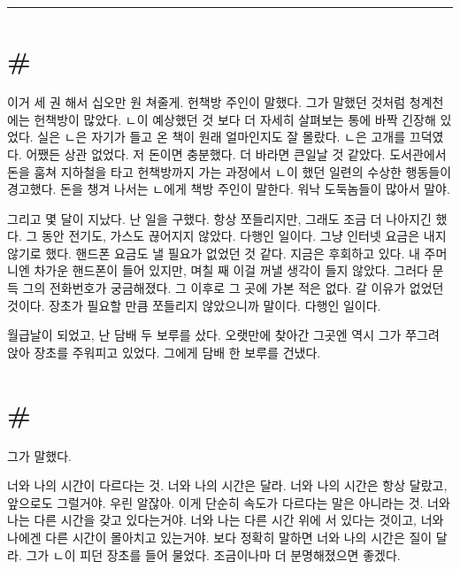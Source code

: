\documentclass[a5paper,10pt, twoside, openright]{memoir}
\begin{document}
	\clearpage{}
		\savepagenumber
		\pagestyle{empty} 
	\rule[0pt]{\textwidth}{\textheight}
	

	\clearpage{}
		\restorepagenumber
		\pagestyle{plain}

	\section{\#}
	이거 세 권 해서 십오만 원 쳐줄게. 헌책방 주인이 말했다. 그가 말했던 것처럼 청계천에는 헌책방이 많았다. ㄴ이 예상했던 것 보다 더 자세히 살펴보는 통에 바짝 긴장해 있었다. 실은 ㄴ은 자기가 들고 온 책이 원래 얼마인지도 잘 몰랐다. ㄴ은 고개를 끄덕였다. 어쨌든 상관 없었다. 저 돈이면 충분했다. 더 바라면 큰일날 것 같았다. 도서관에서 돈을 훔쳐 지하철을 타고 헌책방까지 가는 과정에서 ㄴ이 했던 일련의 수상한 행동들이 경고했다. 돈을 챙겨 나서는 ㄴ에게 책방 주인이 말한다. 워낙 도둑놈들이 많아서 말야. 

	그리고 몇 달이 지났다. 난 일을 구했다. 항상 쪼들리지만, 그래도 조금 더 나아지긴 했다. 그 동안 전기도, 가스도 끊어지지 않았다. 다행인 일이다. 그냥 인터넷 요금은 내지 않기로 했다. 핸드폰 요금도 낼 필요가 없었던 것 같다. 지금은 후회하고 있다. 내 주머니엔 차가운 핸드폰이 들어 있지만, 며칠 째 이걸 꺼낼 생각이 들지 않았다. 그러다 문득 그의 전화번호가 궁금해졌다. 그 이후로 그 곳에 가본 적은 없다. 갈 이유가 없었던 것이다. 장초가 필요할 만큼 쪼들리지 않았으니까 말이다. 다행인 일이다. 

	월급날이 되었고, 난 담배 두 보루를 샀다. 오랫만에 찾아간 그곳엔 역시 그가 쭈그려 앉아 장초를 주워피고 있었다. 그에게 담배 한 보루를 건냈다. 

	\section{\#}
	그가 말했다. 

	너와 나의 시간이 다르다는 것. 너와 나의 시간은 달라. 너와 나의 시간은 항상 달랐고, 앞으로도 그럴거야. 우린 알잖아. 이게 단순히 속도가 다르다는 말은 아니라는 것. 너와 나는 다른 시간을 갖고 있다는거야. 너와 나는 다른 시간 위에 서 있다는 것이고, 너와 나에겐 다른 시간이 몰아치고 있는거야. 보다 정확히 말하면 너와 나의 시간은 질이 달라. 그가 ㄴ이 피던 장초를 들어 물었다. 조금이나마 더 분명해졌으면 좋겠다. 
\end{document}

